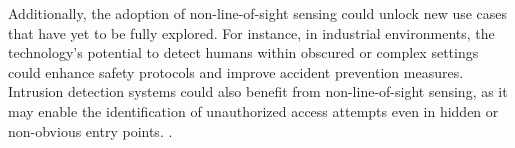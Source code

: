 	Additionally, the adoption of non-line-of-sight sensing could unlock new use cases that have yet to be fully explored. For instance, in industrial environments, the technology's potential to detect humans within obscured or complex settings could enhance safety protocols and improve accident prevention measures. Intrusion detection systems could also benefit from non-line-of-sight sensing, as it may enable the identification of unauthorized access attempts even in hidden or non-obvious entry points. 
	.
	

